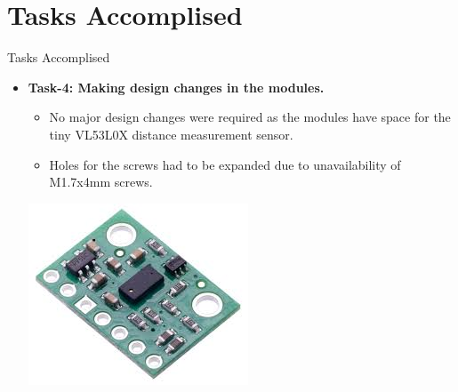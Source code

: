 \documentclass[10pt, a4paper]{beamer}
\begin{document}
\section{Tasks Accomplised}
\begin{frame}{Tasks Accomplised}
	\begin{itemize}
		\item \textbf{Task-4: Making design changes in the modules.}
		\begin{itemize}
		    \item No major design changes were required as the modules have space for the tiny VL53L0X distance measurement sensor. 
		    \item Holes for the screws had to be expanded due to unavailability of M1.7x4mm screws.
		\end{itemize}
		\vspace{15pt}
        \centering\includegraphics[scale=0.45]{download.jpg}
	\end{itemize}
\end{frame}
\end{document}
